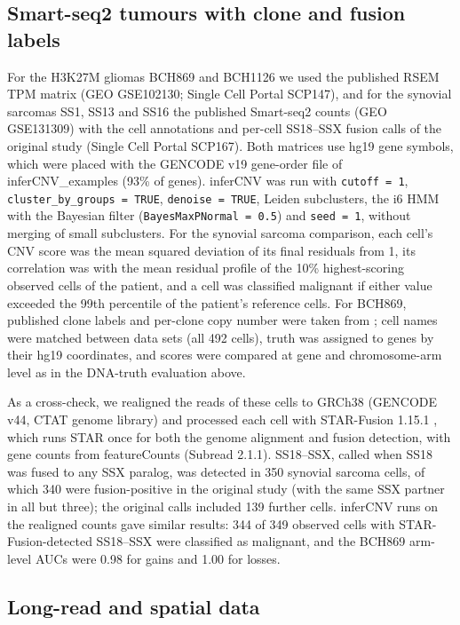 \subsection{Smart-seq2 tumours with clone and fusion labels}

For the H3K27M gliomas BCH869 and BCH1126 \citep{filbin2018} we used the published RSEM TPM matrix (GEO GSE102130; Single Cell Portal SCP147), and for the synovial sarcomas SS1, SS13 and SS16 \citep{jerbyarnon2021} the published Smart-seq2 counts (GEO GSE131309) with the cell annotations and per-cell SS18--SSX fusion calls of the original study (Single Cell Portal SCP167). Both matrices use hg19 gene symbols, which were placed with the GENCODE v19 gene-order file of inferCNV\_examples (93\% of genes). inferCNV was run with \texttt{cutoff\ =\ 1}, \texttt{cluster\_by\_groups\ =\ TRUE}, \texttt{denoise\ =\ TRUE}, Leiden subclusters, the i6 HMM with the Bayesian filter (\texttt{BayesMaxPNormal\ =\ 0.5}) and \texttt{seed\ =\ 1}, without merging of small subclusters. For the synovial sarcoma comparison, each cell's CNV score was the mean squared deviation of its final residuals from 1, its correlation was with the mean residual profile of the 10\% highest-scoring observed cells of the patient, and a cell was classified malignant if either value exceeded the 99th percentile of the patient's reference cells. For BCH869, published clone labels and per-clone copy number were taken from \citet{huang2024xclone}; cell names were matched between data sets (all 492 cells), truth was assigned to genes by their hg19 coordinates, and scores were compared at gene and chromosome-arm level as in the DNA-truth evaluation above.

As a cross-check, we realigned the reads of these cells to GRCh38 (GENCODE v44, CTAT genome library) and processed each cell with STAR-Fusion 1.15.1 \citep{haas2019starfusion}, which runs STAR \citep{dobin2013star} once for both the genome alignment and fusion detection, with gene counts from featureCounts (Subread 2.1.1). SS18--SSX, called when SS18 was fused to any SSX paralog, was detected in 350 synovial sarcoma cells, of which 340 were fusion-positive in the original study (with the same SSX partner in all but three); the original calls included 139 further cells. inferCNV runs on the realigned counts gave similar results: 344 of 349 observed cells with STAR-Fusion-detected SS18--SSX were classified as malignant, and the BCH869 arm-level AUCs were 0.98 for gains and 1.00 for losses.

\subsection{Long-read and spatial data}

